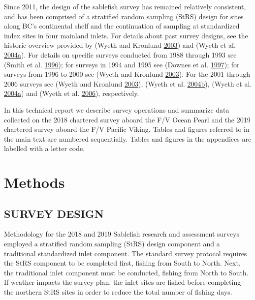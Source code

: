 \documentclass[12pt]{article}\usepackage[]{graphicx}\usepackage[]{color}
\begin{document}
Since 2011, the design of the sablefish survey has remained relatively consistent, and has been comprised of a stratified random sampling (StRS) design for sites along BC's continental shelf and the continuation of sampling at standardized index sites in four mainland inlets. For details about past survey designs, see the historic overview provided by (Wyeth and Kronlund \protect\hyperlink{ref-Wyeth2003}{2003}) and (Wyeth et al. \protect\hyperlink{ref-Wyeth2004b}{2004}\protect\hyperlink{ref-Wyeth2004b}{a}). For details on specific surveys conducted from 1988 through 1993 see (Smith et al. \protect\hyperlink{ref-Smith1996}{1996}); for surveys in 1994 and 1995 see (Downes et al. \protect\hyperlink{ref-Downes1997}{1997}); for surveys from 1996 to 2000 see (Wyeth and Kronlund \protect\hyperlink{ref-Wyeth2003}{2003}). For the 2001 through 2006 surveys see (Wyeth and Kronlund \protect\hyperlink{ref-Wyeth2003}{2003}), (Wyeth et al. \protect\hyperlink{ref-Wyeth2004a}{2004}\protect\hyperlink{ref-Wyeth2004a}{b}), (Wyeth et al. \protect\hyperlink{ref-Wyeth2004b}{2004}\protect\hyperlink{ref-Wyeth2004b}{a}) and (Wyeth et al. \protect\hyperlink{ref-Wyeth2006}{2006}), respectively.

In this technical report we describe survey operations and summarize data collected on the 2018 chartered survey aboard the F/V Ocean Pearl and the 2019 chartered survey aboard the F/V Pacific Viking. Tables and figures referred to in the main text are numbered sequentially. Tables and figures in the appendices are labelled with a letter code.

\hypertarget{methods}{%
\section{Methods}\label{methods}}

\hypertarget{survey-design}{%
\subsection{SURVEY DESIGN}\label{survey-design}}

Methodology for the 2018 and 2019 Sablefish research and assessment surveys employed a stratified random sampling (StRS) design component and a traditional standardized inlet component. The standard survey protocol requires the StRS component to be completed first, fishing from South to North. Next, the traditional inlet component must be conducted, fishing from North to South. If weather impacts the survey plan, the inlet sites are fished before completing the northern StRS sites in order to reduce the total number of fishing days.
\end{document}
